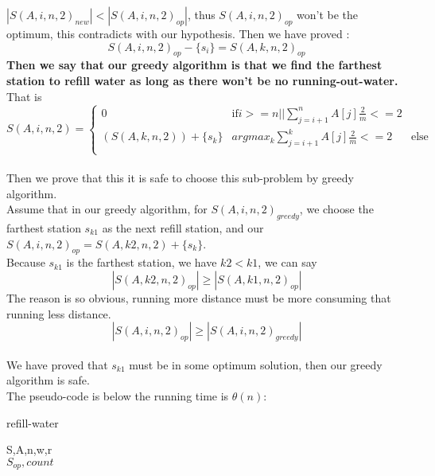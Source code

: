 \documentclass[oneside]{homework} %
\begin{document}
$|S(A,i,n,2)_{new}|<|S(A,i,n,2)_{op}|$, thus $S(A,i,n,2)_{op}$ won't be the optimum, this contradicts with our hypothesis.
Then we have proved :
$$S(A,i,n,2)_{op}-\{s_{i}\} = S(A,k,n,2)_{op}$$
{\bfseries 
  Then we say that our greedy algorithm is that we find the farthest station to refill water as long as there won't be no running-out-water.
}
\\ That is
\begin{equation}
S(A,i,n,2) = \left\{
             \begin{array}{lcl}
			   {0} &\text{if} i>=n || \sum_{j=i+1}^{n}A[j]\frac{2}{m}<=2 & \\
			   {(S(A,k,n,2))+\{s_{k}\}} &argmax_{k} \sum_{j=i+1}^{k}A[j]\frac{2}{m}<=2 &\text{else}\\
             \end{array}  
        \right.
\end {equation}
\\ Then we prove that this it is safe to choose this sub-problem by greedy algorithm.\\
Assume that in our greedy algorithm, for $S(A,i,n,2)_{greedy}$, we choose the farthest station $s_{k1}$ as the next refill station, and our $S(A,i,n,2)_{op} = S(A,k2,n,2)+\{s_{k}\}$.\\
Because $s_{k1}$ is the farthest station, we have $k2<k1$, we can say \\ $$|S(A,k2,n,2)_{op}| \geq |S(A,k1,n,2)_{op}|$$
The reason is so obvious, running more distance must be more consuming that running less distance.
$$|S(A,i,n,2)_{op}| \geq |S(A,i,n,2)_{greedy}|$$
\\We have proved that $s_{k1}$ must be in some optimum solution, then our greedy algorithm is safe.
\\The pseudo-code is below the running time is $\theta(n)$:
\begin{algorithm}[h]
  \caption{refill-water}
  \label{algo:water}
  \begin{algorithmic}[1]
	\REQUIRE S,A,n,w,r
	\ENSURE ~ ~\\ 
	  \ENDIF
	  \ELSE 
	  \ENDIF
	\ENDFOR
	\LASTCON $S_{op},count$
  \end{algorithmic}
\end{algorithm} 
\end{document}
